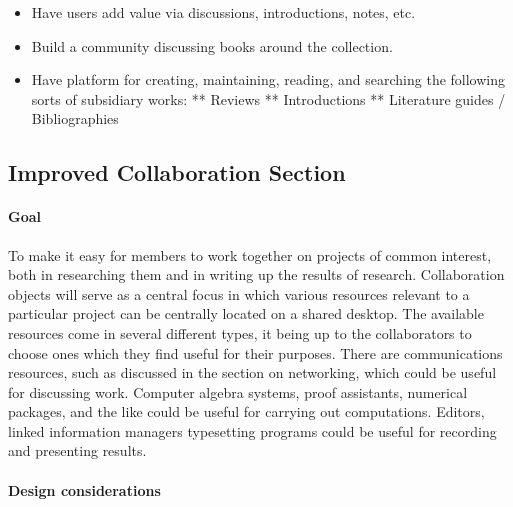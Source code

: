 \begin{itemize}
\item
  Have users add value via discussions, introductions, notes, etc.
\item
  Build a community discussing books around the collection.
\item
  Have platform for creating, maintaining, reading, and searching the
  following sorts of subsidiary works: ** Reviews ** Introductions **
  Literature guides / Bibliographies
\end{itemize}

\subsection{Improved Collaboration Section}

\paragraph{Goal} To make it easy for members to work together on projects of common
interest, both in researching them and in writing up the results of
research. Collaboration objects will serve as a central focus in which
various resources relevant to a particular project can be centrally
located on a shared desktop. The available resources come in several
different types, it being up to the collaborators to choose ones which
they find useful for their purposes. There are communications resources,
such as discussed in the section on networking, which could be useful
for discussing work. Computer algebra systems, proof assistants,
numerical packages, and the like could be useful for carrying out
computations. Editors, linked information managers typesetting programs
could be useful for recording and presenting results.

\paragraph{Design considerations}


